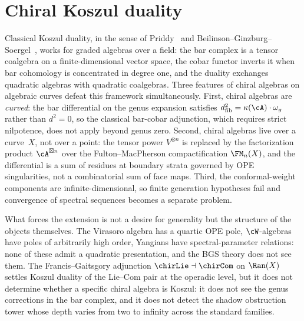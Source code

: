 \chapter{Chiral Koszul duality}
\label{chap:koszul-pairs}\label{ch:chiral-koszul-pairs}

\providecommand{\Conil}{\mathsf{Conil}}
\providecommand{\BP}{\mathrm{BP}}


Classical Koszul duality, in the sense of
Priddy~\cite{Priddy70} and
Beilinson--Ginzburg--Soergel~\cite{BGS96}, works for graded
algebras over a field: the bar complex is a tensor coalgebra on a
finite-dimensional vector space, the cobar functor inverts it
when bar cohomology is concentrated in degree one, and the
duality exchanges quadratic algebras with quadratic coalgebras.
Three features of chiral algebras on algebraic curves defeat
this framework simultaneously. First, chiral algebras are
\emph{curved}: the bar differential on the genus expansion
satisfies $d^2_{\mathrm{fib}} = \kappa(\cA) \cdot \omega_g$
rather than $d^2 = 0$, so the classical bar-cobar adjunction,
which requires strict nilpotence, does not apply beyond genus
zero. Second, chiral algebras live over a curve~$X$, not over a
point: the tensor power $V^{\otimes n}$ is replaced by the
factorization product $\cA^{\boxtimes n}$ over the
Fulton--MacPherson compactification $\FM_n(X)$, and the
differential is a sum of residues at boundary strata governed by
OPE singularities, not a combinatorial sum of face maps. Third,
the conformal-weight components are infinite-dimensional, so
finite generation hypotheses fail and convergence of spectral
sequences becomes a separate problem.

What forces the extension is not a desire for generality but the
structure of the objects themselves. The Virasoro algebra has a
quartic OPE pole, $\cW$-algebras have poles of arbitrarily high
order, Yangians have spectral-parameter relations: none of these
admit a quadratic presentation, and the BGS theory does not see
them. The Francis--Gaitsgory adjunction
$\chirLie \dashv \chirCom$ on $\Ran(X)$~\cite{FG12} settles
Koszul duality of the Lie--Com pair at the operadic level, but
it does not determine whether a specific chiral algebra is
Koszul: it does not see the genus corrections in the bar
complex, and it does not detect the shadow obstruction tower
whose depth varies from two to infinity across the standard
families.

